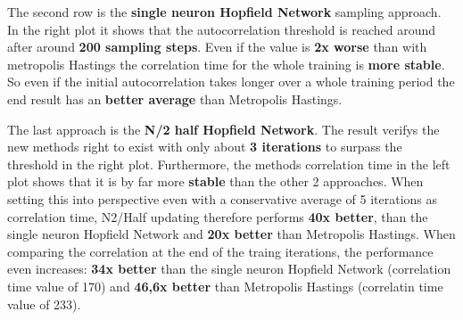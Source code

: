 The second row is the \textbf{single neuron Hopfield Network} sampling approach. 
In the right plot it shows that the autocorrelation threshold is reached around after around \textbf{200 sampling steps}.
Even if the value is \textbf{2x worse} than with metropolis Hastings the correlation time for the whole training is \textbf{more stable}.
So even if the initial autocorrelation takes longer over a whole training period the end result has an \textbf{better average} than Metropolis Hastings.

The last approach is the \textbf{N/2 half Hopfield Network}. 
The result verifys the new methods right to exist with only about \textbf{3 iterations} to surpass the threshold in the right plot.
Furthermore, the methods correlation time in the left plot shows that it is by far more \textbf{stable} than the other 2 approaches.
When setting this into perspective even with a conservative average of 5 iterations as correlation time, N2/Half updating therefore
performs \textbf{40x better}, than the single neuron Hopfield Network and \textbf{20x better} than Metropolis Hastings.
When comparing the correlation at the end of the traing iterations, the performance even increases: \textbf{34x better} than the single neuron Hopfield Network (correlation time value of 170) and \textbf{46,6x better} than Metropolis Hastings (correlatin time value of 233).
 

